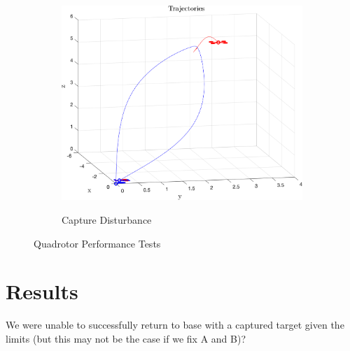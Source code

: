 \documentclass{article}
\begin{document}
\begin{multicols}{2}
\begin{figure}[H]
\begin{subfigure}[b]{0.45\columnwidth}
    \centering
    \includegraphics[width = 1\textwidth]{images/Intercept.png}
     \label{fig:CaptureW}
     \vspace{-5mm}
     \caption{Capture Disturbance}
 \end{subfigure}
   \caption{Quadrotor Performance Tests}
\end{figure}

\section*{Results}
We were unable to successfully return to base with a captured target given the limits (but this may not be the case if we fix A and B)?

\end{multicols}
\end{document}
